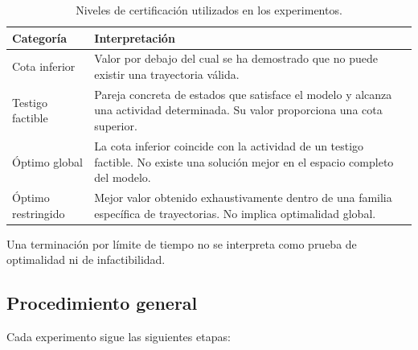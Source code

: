 \begin{table}[htbp]
    \centering
    \caption{Niveles de certificación utilizados en los experimentos.}
    \label{tab:certificacion_resultados}
    \begin{tabular}{p{}p{}}
        \hline
        \textbf{Categoría} & \textbf{Interpretación} \\
        \hline

        Cota inferior
        &
        Valor por debajo del cual se ha demostrado que no puede existir
        una trayectoria válida.
        \\[3pt]

        Testigo factible
        &
        Pareja concreta de estados que satisface el modelo y alcanza una
        actividad determinada. Su valor proporciona una cota superior.
        \\[3pt]

        Óptimo global
        &
        La cota inferior coincide con la actividad de un testigo factible.
        No existe una solución mejor en el espacio completo del modelo.
        \\[3pt]

        Óptimo restringido
        &
        Mejor valor obtenido exhaustivamente dentro de una familia
        específica de trayectorias. No implica optimalidad global.
        \\
        \hline
    \end{tabular}
\end{table}

Una terminación por límite de tiempo no se interpreta como prueba de
optimalidad ni de infactibilidad.


\subsection{Procedimiento general}
\label{subsec:procedimiento_general}

Cada experimento sigue las siguientes etapas:

